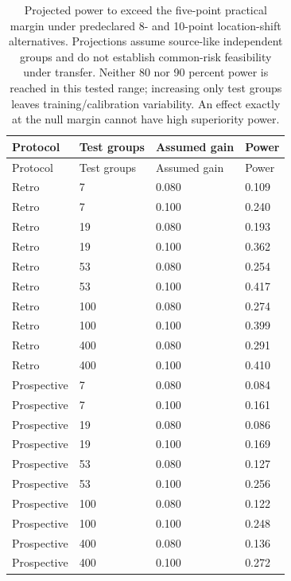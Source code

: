 {\tabletext
\setlength{\tabcolsep}{3pt}
\begin{longtable}{p{}p{}p{}p{}}
\caption{Projected power to exceed the five-point practical margin under predeclared 8- and 10-point location-shift alternatives. Projections assume source-like independent groups and do not establish common-risk feasibility under transfer. Neither 80 nor 90 percent power is reached in this tested range; increasing only test groups leaves training/calibration variability. An effect exactly at the null margin cannot have high superiority power.}\label{tab:r3si-power}\\
\toprule
Protocol & Test groups & Assumed gain & Power \\
\midrule
\endfirsthead
\toprule
Protocol & Test groups & Assumed gain & Power \\
\midrule
\endhead
Retro & 7 & 0.080 & 0.109 \\
Retro & 7 & 0.100 & 0.240 \\
Retro & 19 & 0.080 & 0.193 \\
Retro & 19 & 0.100 & 0.362 \\
Retro & 53 & 0.080 & 0.254 \\
Retro & 53 & 0.100 & 0.417 \\
Retro & 100 & 0.080 & 0.274 \\
Retro & 100 & 0.100 & 0.399 \\
Retro & 400 & 0.080 & 0.291 \\
Retro & 400 & 0.100 & 0.410 \\
Prospective & 7 & 0.080 & 0.084 \\
Prospective & 7 & 0.100 & 0.161 \\
Prospective & 19 & 0.080 & 0.086 \\
Prospective & 19 & 0.100 & 0.169 \\
Prospective & 53 & 0.080 & 0.127 \\
Prospective & 53 & 0.100 & 0.256 \\
Prospective & 100 & 0.080 & 0.122 \\
Prospective & 100 & 0.100 & 0.248 \\
Prospective & 400 & 0.080 & 0.136 \\
Prospective & 400 & 0.100 & 0.272 \\
\bottomrule
\end{longtable}
}

